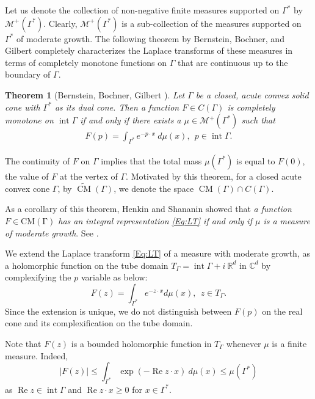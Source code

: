 \documentclass[11pt,reqno]{amsart}
\theoremstyle{plain}
\newtheorem{theorem}{Theorem}[section]
\theoremstyle{definition}
\numberwithin{equation}{section}
\begin{document}
       Let us denote the collection of non-negative finite measures supported on $\Gamma^*$ by $\mathcal{M}^+(\Gamma^*)$. Clearly, $\mathcal{M}^+(\Gamma^*)$ is a sub-collection of the measures supported on $\Gamma^*$ of moderate growth. The following theorem by Bernstein, Bochner, and Gilbert completely characterizes the Laplace transforms of these measures in terms of completely monotone functions on $\Gamma$ that are continuous up to the boundary of $\Gamma$.
	\begin{theorem}[Bernstein, Bochner, Gilbert \cite{Bernstein, Bochner}] \label{Thm:BBG}
		Let $\Gamma$ be a closed, acute convex solid cone with $\Gamma^*$ as its dual cone. Then a function $F\in C(\Gamma)$ is completely monotone on $\operatorname{int} \Gamma$ if and only if there exists a $\mu\in \mathcal M^+(\Gamma^*)$ such that 
		\begin{align*}
			F(p)= \int_{\Gamma^*} e^{-p\cdot x} \ d\mu(x), \ \ p \in \operatorname{int} \Gamma.
		\end{align*}
	\end{theorem}
	The continuity of $F$ on $\Gamma$ implies that the total mass $\mu(\Gamma^*)$ is equal to $F(0)$, the value of $F$ at the vertex of $\Gamma$.
Motivated by this theorem, for a closed acute convex cone $\Gamma$, by $\widetilde{\operatorname{CM}}(\Gamma)$, we denote the space $\operatorname{CM}(\Gamma)\cap C(\Gamma)$.

As a corollary of this theorem, Henkin and Shananin showed that {\em a function $F\in\operatorname{CM(\Gamma)}$ has an integral representation 
    \eqref{Eq:LT} if and only if $\mu$ is a measure of moderate growth}. See \cite[Corollary 2.2]{HS}.

\vspace{2mm}
We extend the Laplace transform \eqref{Eq:LT} of a measure with moderate growth, as a holomorphic function on the tube domain $T_\Gamma = \operatorname{int} \Gamma + i \ \mathbb{R}^d$ in $\mathbb{C}^d$ by complexifying the $p$ variable as below:
$$
F(z) = \int_{\Gamma^*} e^{-z\cdot x} d\mu(x), \ \ z\in T_{\Gamma}.
$$
Since the extension is unique, we do not distinguish between $F(p)$ on the real cone and its complexification on the tube domain. 

Note that $F(z)$ is a bounded holomorphic function in $T_{\Gamma}$ whenever $\mu$ is a finite measure. Indeed, 
$$
|F(z)| \leq \int_{\Gamma^*} \exp {(- \operatorname{Re} z \cdot x)}\  d\mu(x) \leq \mu(\Gamma^*)
$$
 as $\operatorname{Re} z \in \operatorname{int} \Gamma$ and $\operatorname{Re} z \cdot x \geq 0$ for $x\in \Gamma^*$.
    
\end{document}
